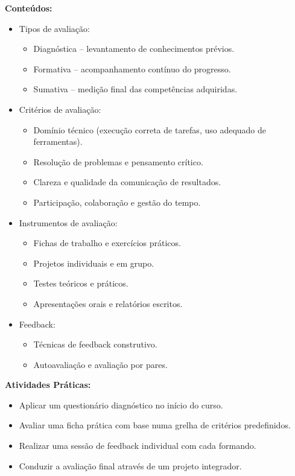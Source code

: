 \documentclass[12pt]{article}
\begin{document}
\textbf{Conteúdos:}
\begin{itemize}
  \item Tipos de avaliação:
    \begin{itemize}
      \item Diagnóstica – levantamento de conhecimentos prévios.
      \item Formativa – acompanhamento contínuo do progresso.
      \item Sumativa – medição final das competências adquiridas.
    \end{itemize}
  \item Critérios de avaliação:
    \begin{itemize}
      \item Domínio técnico (execução correta de tarefas, uso adequado de ferramentas).
      \item Resolução de problemas e pensamento crítico.
      \item Clareza e qualidade da comunicação de resultados.
      \item Participação, colaboração e gestão do tempo.
    \end{itemize}
  \item Instrumentos de avaliação:
    \begin{itemize}
      \item Fichas de trabalho e exercícios práticos.
      \item Projetos individuais e em grupo.
      \item Testes teóricos e práticos.
      \item Apresentações orais e relatórios escritos.
    \end{itemize}
  \item Feedback:
    \begin{itemize}
      \item Técnicas de feedback construtivo.
      \item Autoavaliação e avaliação por pares.
    \end{itemize}
\end{itemize}

\textbf{Atividades Práticas:}
\begin{itemize}
  \item Aplicar um questionário diagnóstico no início do curso.
  \item Avaliar uma ficha prática com base numa grelha de critérios predefinidos.
  \item Realizar uma sessão de feedback individual com cada formando.
  \item Conduzir a avaliação final através de um projeto integrador.
\end{itemize}
\end{document}
